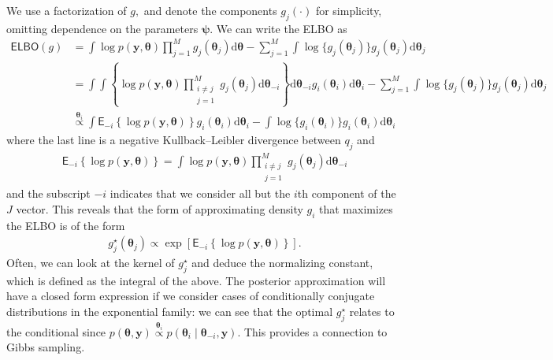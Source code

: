 \documentclass[
  11pt,
  letterpaper,
]{scrbook}
\theoremstyle{definition}
\theoremstyle{definition}
\theoremstyle{definition}
\theoremstyle{plain}
\theoremstyle{plain}
\theoremstyle{plain}
\theoremstyle{remark}
\begin{document}
We use a factorization of \(g,\) and denote the components
\(g_j(\cdot)\) for simplicity, omitting dependence on the parameters
\(\boldsymbol{\psi}.\) We can write the ELBO as \begin{align*}
\mathsf{ELBO}(g) &= \int \log p(\boldsymbol{y}, \boldsymbol{\theta}) \prod_{j=1}^M g_j(\boldsymbol{\theta}_j)\mathrm{d} \boldsymbol{\theta} - \sum_{j=1}^M \int \log \{ g_j(\boldsymbol{\theta}_j) \} g_j(\boldsymbol{\theta}_j) \mathrm{d}  \boldsymbol{\theta}_j
 \\& = \int \int \left\{\log p(\boldsymbol{y}, \boldsymbol{\theta}) \prod_{\substack{i \neq j \\j=1}}^M g_j(\boldsymbol{\theta}_j)\mathrm{d} \boldsymbol{\theta}_{-i}\right\} \mathrm{d} \boldsymbol{\theta}_{-i} g_i(\boldsymbol{\theta}_i) \mathrm{d} \boldsymbol{\theta}_i - \sum_{j=1}^M \int \log \{ g_j(\boldsymbol{\theta}_j) \} g_j(\boldsymbol{\theta}_j) \mathrm{d}  \boldsymbol{\theta}_j
 \\& \stackrel{\boldsymbol{\theta}_i}{\propto} \int \mathsf{E}_{-i}\left\{\log p(\boldsymbol{y}, \boldsymbol{\theta})\right\} g_i(\boldsymbol{\theta}_i) \mathrm{d} \boldsymbol{\theta}_i - \int \log \{ g_i(\boldsymbol{\theta}_i) \} g_i(\boldsymbol{\theta}_i) \mathrm{d} \boldsymbol{\theta}_i
\end{align*} where the last line is a negative Kullback--Leibler
divergence between \(q_j\) and \begin{align*}
 \mathsf{E}_{-i}\left\{\log p(\boldsymbol{y}, \boldsymbol{\theta})\right\} = \int \log p(\boldsymbol{y}, \boldsymbol{\theta}) \prod_{\substack{i \neq j \\j=1}}^M g_j(\boldsymbol{\theta}_j)\mathrm{d} \boldsymbol{\theta}_{-i}
\end{align*} and the subscript \(-i\) indicates that we consider all but
the \(i\)th component of the \(J\) vector. This reveals that the form of
approximating density \(g_i\) that maximizes the ELBO is of the form
\begin{align*}
 g^{\star}_j(\boldsymbol{\theta}_j) \propto \exp \left[ \mathsf{E}_{-i}\left\{\log p(\boldsymbol{y}, \boldsymbol{\theta})\right\}\right].
\end{align*} Often, we can look at the kernel of \(g^{\star}_j\) and
deduce the normalizing constant, which is defined as the integral of the
above. The posterior approximation will have a closed form expression if
we consider cases of conditionally conjugate distributions in the
exponential family: we can see that the optimal \(g^{\star}_j\) relates
to the conditional since
\(p(\boldsymbol{\theta}, \boldsymbol{y}) \stackrel{\boldsymbol{\theta}_i}{\propto} p(\boldsymbol{\theta}_i \mid \boldsymbol{\theta}_{-i}, \boldsymbol{y}).\)
This provides a connection to Gibbs sampling.
\end{document}
